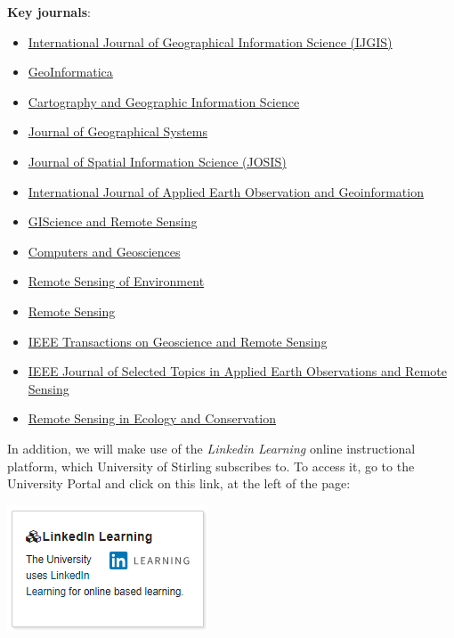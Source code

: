 \documentclass[
]{book}
\begin{document}
\textbf{Key journals}:

\begin{itemize}
\item
  \href{https://www.tandfonline.com/toc/tgis20/current}{International Journal of Geographical Information Science (IJGIS)}
\item
  \href{https://www.springer.com/journal/10707}{GeoInformatica}
\item
  \href{https://www.tandfonline.com/loi/tcag20}{Cartography and Geographic Information Science}
\item
  \href{https://link.springer.com/article/10.1007/s10109-019-00318-x}{Journal of Geographical Systems}
\item
  \href{https://www.josis.org/index.php/josis}{Journal of Spatial Information Science (JOSIS)}
\item
  \href{https://www.journals.elsevier.com/international-journal-of-applied-earth-observation-and-geoinformation}{International Journal of Applied Earth Observation and Geoinformation}
\item
  \href{https://www.tandfonline.com/loi/tgrs20}{GIScience and Remote Sensing}
\item
  \href{https://www.journals.elsevier.com/computers-and-geosciences}{Computers and Geosciences}
\item
  \href{https://www.journals.elsevier.com/remote-sensing-of-environment}{Remote Sensing of Environment}
\item
  \href{https://www.mdpi.com/journal/remotesensing}{Remote Sensing}
\item
  \href{https://ieeexplore.ieee.org/xpl/RecentIssue.jsp?punumber=36}{IEEE Transactions on Geoscience and Remote Sensing}
\item
  \href{https://ieeexplore.ieee.org/xpl/RecentIssue.jsp?punumber=4609443}{IEEE Journal of Selected Topics in Applied Earth Observations and Remote Sensing}
\item
  \href{https://zslpublications.onlinelibrary.wiley.com/journal/20563485}{Remote Sensing in Ecology and Conservation}
\end{itemize}

In addition, we will make use of the \emph{Linkedin Learning} online instructional platform, which University of Stirling subscribes to. To access it, go to the University Portal and click on this link, at the left of the page:

\begin{center}\includegraphics[width=0.25\linewidth]{images/linkedin_image} \end{center}
\end{document}
